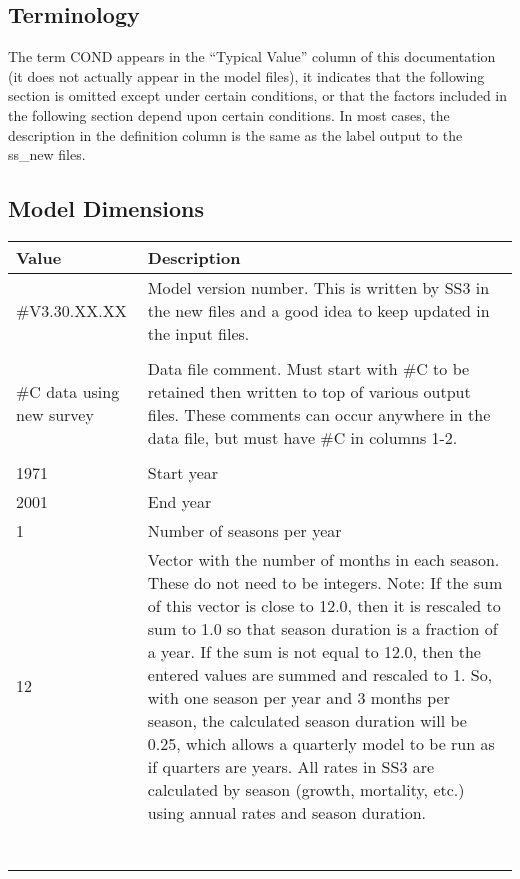 \subsection{Terminology}
The term COND appears in the ``Typical Value'' column of this documentation (it does not actually appear in the model files), it indicates that the following section is omitted except under certain conditions, or that the factors included in the following section depend upon certain conditions. In most cases, the description in the definition column is the same as the label output to the ss\_new files.

\subsection{Model Dimensions}
\begin{center}
	\begin{longtable}{p{4cm} p{12cm}}
		\hline
		\textbf{Value} & \textbf{Description} \Tstrut\Bstrut\\
		\hline
		\#V3.30.XX.XX & \multirow{1}{1cm}[-0.1cm]{\parbox{12cm}{Model version number.  This is written by SS3 in the  new files and a good idea to keep updated in the input files.}} \Tstrut\\
		&  \Bstrut\\

		\hline
		\#C data using new survey & \multirow{1}{1cm}[-0.1cm]{\parbox{12cm}{Data file comment. Must start with \#C to be retained then written to top of various output files.  These comments can occur anywhere in the data file, but must have \#C in columns 1-2.}} \Tstrut\\
		&  \Bstrut\\

		\hline
		1971 & Start year \Tstrut\Bstrut\\

		\hline
		2001 & End year \Tstrut\Bstrut\\

		\hline
		1 & Number of seasons per year \Tstrut\Bstrut\\

		\hline
		12 & \multirow{1}{1cm}[-0.1cm]{\parbox{12cm}{Vector with the number of months in each season.  These do not need to be integers.  Note:  If the sum of this vector is close to 12.0, then it is rescaled to sum to 1.0 so that season duration is a fraction of a year.  If the sum is not equal to 12.0, then the entered values are summed and rescaled to 1.  So, with one season per year and 3 months per season, the calculated season duration will be 0.25, which allows a quarterly model to be run as if quarters are years.  All rates in SS3 are  calculated by season (growth, mortality, etc.) using annual rates and season duration.}} \Tstrut\\
		& \\
		& \\
		& \\
		& \\
		& \\
		& \\
		& \Bstrut\\
		

\end{longtable}
\end{center}
